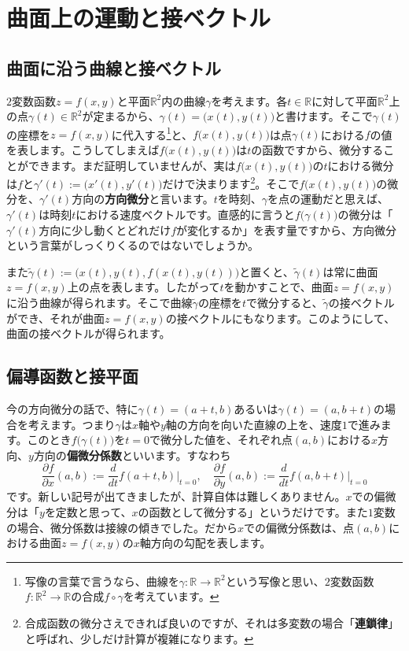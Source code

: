\section{曲面上の運動と接ベクトル}

\subsection{曲面に沿う曲線と接ベクトル}

$2$変数函数$z=f(x,y)$と平面$\mathbb{R}^2$内の曲線$\gamma$を考えます。各$t\in\mathbb{R}$に対して平面$\mathbb{R}^2$上の点$\gamma(t)\in\mathbb{R}^2$が定まるから、$\gamma(t) = \bigl(x(t), y(t)\bigr)$と書けます。そこで$\gamma(t)$の座標を$z = f(x, y)$に代入する\footnote{写像の言葉で言うなら、曲線を$\gamma\colon\mathbb{R}\rightarrow\mathbb{R}^2$という写像と思い、$2$変数函数$f\colon\mathbb{R}^2\rightarrow\mathbb{R}$の合成$f\circ\gamma$を考えています。}と、$f\bigl(x(t), y(t)\bigr)$は点$\gamma(t)$における$f$の値を表します。こうしてしまえば$f\bigl(x(t), y(t)\bigr)$は$t$の函数ですから、微分することができます。まだ証明していませんが、実は$f\bigl(x(t), y(t)\bigr)$の$t$における微分は$f$と$\gamma'(t) := \bigl(x'(t), y'(t)\bigr)$だけで決まります\footnote{合成函数の微分さえできれば良いのですが、それは多変数の場合「\textbf{連鎖律}」と呼ばれ、少しだけ計算が複雑になります。}。そこで$f\bigl(x(t), y(t)\bigr)$の微分を、$\gamma'(t)$方向の\textbf{方向微分}と言います。$t$を時刻、$\gamma$を点の運動だと思えば、$\gamma'(t)$は時刻$t$における速度ベクトルです。直感的に言うと$f\bigl(\gamma(t)\bigr)$の微分は「$\gamma'(t)$方向に少し動くとどれだけ$f$が変化するか」を表す量ですから、方向微分という言葉がしっくりくるのではないでしょうか。

また$\tilde{\gamma}(t):=\bigl(x(t), y(t), f(x(t), y(t))\bigr)$と置くと、$\tilde{\gamma}(t)$は常に曲面$z = f(x,y)$上の点を表します。したがって$t$を動かすことで、曲面$z = f(x, y)$に沿う曲線が得られます。そこで曲線$\tilde{\gamma}$の座標を$t$で微分すると、$\tilde{\gamma}$の接ベクトルができ、それが曲面$z = f(x, y)$の接ベクトルにもなります。このようにして、曲面の接ベクトルが得られます。

\subsection{偏導函数と接平面}

今の方向微分の話で、特に$\gamma(t) = (a+t, b)$あるいは$\gamma(t) = (a, b+t)$の場合を考えます。つまり$\gamma$は$x$軸や$y$軸の方向を向いた直線の上を、速度$1$で進みます。このとき$f\bigl(\gamma(t)\bigr)$を$t=0$で微分した値を、それぞれ点$(a, b)$における$x$方向、$y$方向の\textbf{偏微分係数}といいます。すなわち
\[
\frac{\partial f}{\partial x}(a, b) := \frac{d}{dt}f(a+t, b)\Bigr|_{t=0}, \quad \frac{\partial f}{\partial y}(a, b) := \frac{d}{dt}f(a, b+t)\Bigr|_{t=0}
\]
です。新しい記号が出てきましたが、計算自体は難しくありません。$x$での偏微分は「$y$を定数と思って、$x$の函数として微分する」というだけです。また$1$変数の場合、微分係数は接線の傾きでした。だから$x$での偏微分係数は、点$(a,b)$における曲面$z = f(x, y)$の$x$軸方向の勾配を表します。

